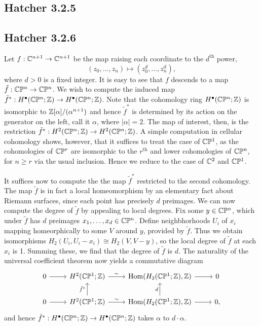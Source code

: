 \documentclass{../mathnotes}
\begin{document}
\subsection*{Hatcher 3.2.5}

\subsection*{Hatcher 3.2.6}

Let $f:\mathbb{C}^{n+1}\to\mathbb{C}^{n+1}$ be the map raising each coordinate to the $d^\text{th}$ power,
\[(z_0,\ldots,z_n)\mapsto (z_0^d,\ldots,z_n^d),\]
where $d>0$ is a fixed integer. It is easy to see that $f$ descends to a map
$\tilde f:\mathbb{C}\mathbb{P}^n\to\mathbb{C}\mathbb{P}^n$. We wish to compute the induced map
$\tilde f^*:H^\bullet(\mathbb{C}\mathbb{P}^n;\mathbb{Z})\to H^\bullet(\mathbb{C}\mathbb{P}^n;\mathbb{Z})$. Note that the cohomology ring
$H^\bullet(\mathbb{C}\mathbb{P}^n;\mathbb{Z})$ is isomorphic to $\mathbb{Z}[\alpha]/(\alpha^{n+1})$ and hence
$\tilde f^*$ is determined by its action on the generator on the left, call it $\alpha$,
where $|\alpha|=2$. The map of interest, then, is the restriction
$\tilde f^*:H^2(\mathbb{C}\mathbb{P}^n;\mathbb{Z})\to H^2(\mathbb{C}\mathbb{P}^n;\mathbb{Z})$. A simple computation in cellular cohomology
shows, however, that it suffices to treat the case of $\mathbb{C}\mathbb{P}^1$, as the cohomologies of
$\mathbb{C}\mathbb{P}^r$ are isomorphic to the $r^{\text{th}}$ and lower cohomologies of $\mathbb{C}\mathbb{P}^n$, for $n\geqslant r$
via the usual inclusion. Hence we reduce to the case of $\mathbb{C}^2$ and $\mathbb{C}\mathbb{P}^1$.

It suffices
now to compute the the map $\tilde f^*$ restricted to the second cohomology. The map
$\tilde f$ is in fact a local homeomorphism by an elementary fact about Riemann surfaces,
since each point has precisely $d$ preimages. We can now compute the degree of 
$\tilde f$ by appealing to local degrees. Fix some $y\in\mathbb{C}\mathbb{P}^n$, which under $\tilde f$
has $d$ preimages $x_1,\ldots, x_d\in\mathbb{C}\mathbb{P}^n$. Define neighbhorhoods $U_i$ of $x_i$ mapping
homeorphically to some $V$ around $y$, provided by $\tilde f$. Thus we obtain isomorphisms
$H_2(U_i,U_i-x_i)\cong H_2(V,V-y)$, so the local degree of $\tilde f$ at each $x_i$
is 1. Summing these, we find that the degree of $\tilde f$ is $d$. The naturality of
the universal coefficient theorem now yields a commutative diagram
\begin{equation*}
    \begin{tikzcd}
        0\ar{r} & H^2(\CP^1;\Z)\ar{r}{\sim} & \Hom(H_2(\CP^1;\Z),\Z)\ar{r} & 0\\
        0\ar{r} & H^2(\CP^1;\Z)\ar{r}{\sim}\ar{u}{\tilde f^*} & \Hom(H_2(\CP^1;\Z),\Z)\ar{r}\ar{u}{d} & 0,
    \end{tikzcd}
\end{equation*}
and hence $\tilde f^*:H^\bullet(\mathbb{C}\mathbb{P}^n;\mathbb{Z})\to H^\bullet(\mathbb{C}\mathbb{P}^n;\mathbb{Z})$ takes $\alpha$ to $d\cdot \alpha$.
\end{document}
